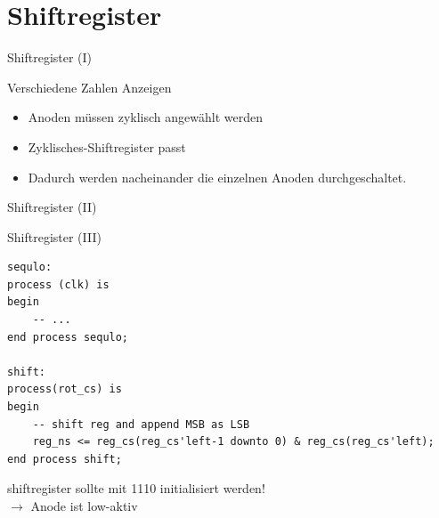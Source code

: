 \documentclass[aspectratio=169,presentation]{beamer}
\begin{document}

\section{Shiftregister}
\begin{frame} {Shiftregister (I)}
  \begin{block} {Verschiedene Zahlen Anzeigen}
    \begin{itemize}
      \item Anoden müssen zyklisch angewählt werden
      \item Zyklisches-Shiftregister passt
      \item Dadurch werden nacheinander die einzelnen Anoden durchgeschaltet.
    \end{itemize}
  \end{block}
\end{frame}

\begin{frame} [fragile] {Shiftregister (II)}
  \begin{center}
  \end{center}
\end{frame}

\begin{frame} [fragile] {Shiftregister (III)}
	\begin{lstlisting}
sequlo:
process (clk) is
begin
	-- ...
end process sequlo;

shift:
process(rot_cs) is 
begin
	-- shift reg and append MSB as LSB
	reg_ns <= reg_cs(reg_cs'left-1 downto 0) & reg_cs(reg_cs'left);
end process shift;
  \end{lstlisting}
  
  \begin{alertblock} {}
    shiftregister sollte mit \grqq{}1110\grqq{} initialisiert werden!\\
	  $\rightarrow$ Anode ist low-aktiv
  \end{alertblock}
\end{frame}
\end{document}
